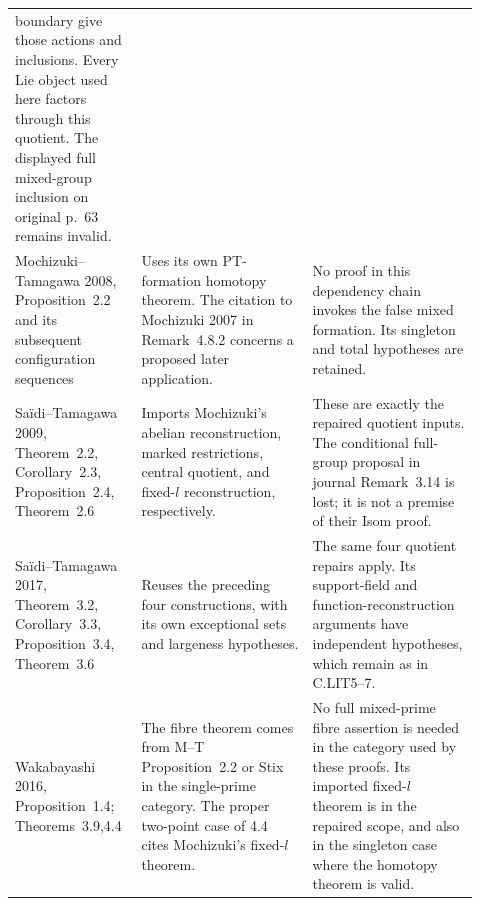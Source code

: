 \begin{center}
\begin{longtable}{p{0.23\linewidth}p{0.35\linewidth}p{0.34\linewidth}}
boundary give those actions and inclusions. Every Lie object
used here factors through this quotient. The displayed full
mixed-group inclusion on original p.~63 remains invalid.\\
Mochizuki--Tamagawa 2008, Proposition~2.2 and its subsequent
configuration sequences&
Uses its own PT-formation homotopy theorem. The citation to
Mochizuki 2007 in Remark~4.8.2 concerns a proposed later
application.&
No proof in this dependency chain invokes the false mixed
formation. Its singleton and total hypotheses are retained.\\
Sa\"idi--Tamagawa 2009, Theorem~2.2, Corollary~2.3,
Proposition~2.4, Theorem~2.6&
Imports Mochizuki's abelian reconstruction, marked restrictions,
central quotient, and fixed-$l$ reconstruction, respectively.&
These are exactly the repaired quotient inputs. The conditional
full-group proposal in journal Remark~3.14 is lost; it is not a
premise of their Isom proof.\\
Sa\"idi--Tamagawa 2017, Theorem~3.2, Corollary~3.3,
Proposition~3.4, Theorem~3.6&
Reuses the preceding four constructions, with its own exceptional
sets and largeness hypotheses.&
The same four quotient repairs apply. Its support-field and
function-reconstruction arguments have independent hypotheses,
which remain as in C.LIT5--7.\\
Wakabayashi 2016, Proposition~1.4; Theorems~3.9,4.4&
The fibre theorem comes from M--T Proposition~2.2 or Stix in
the single-prime category. The proper two-point case of 4.4
cites Mochizuki's fixed-$l$ theorem.&
No full mixed-prime fibre assertion is needed in the category
used by these proofs. Its imported fixed-$l$ theorem is in the
repaired scope, and also in the singleton case where the
homotopy theorem is valid.\\
\bottomrule
\end{longtable}
\end{center}
